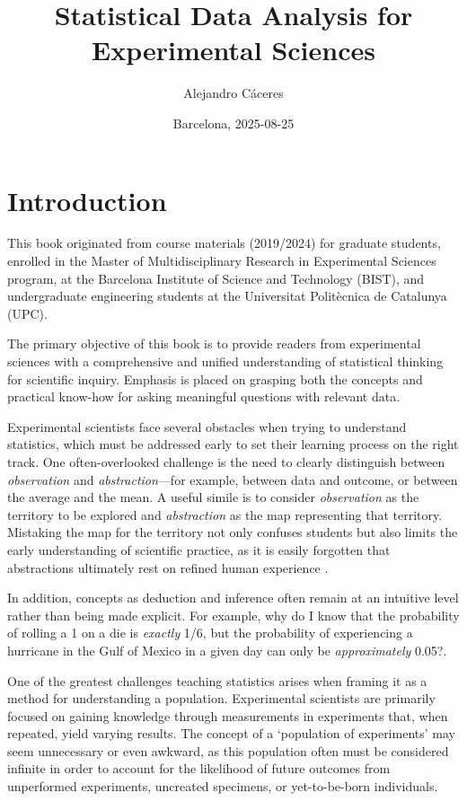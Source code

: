 \documentclass[
]{book}
\title{Statistical Data Analysis
for
Experimental Sciences}
\author{Alejandro Cáceres}
\date{Barcelona, 2025-08-25}
\begin{document}
\maketitle

{
\setcounter{tocdepth}{1}
\tableofcontents
}
\hypertarget{introduction}{%
\chapter{Introduction}\label{introduction}}

This book originated from course materials (2019/2024) for graduate students, enrolled in the Master of Multidisciplinary Research in Experimental Sciences program, at the Barcelona Institute of Science and Technology (BIST), and undergraduate engineering students at the Universitat Politècnica de Catalunya (UPC).

The primary objective of this book is to provide readers from experimental sciences with a comprehensive and unified understanding of statistical thinking for scientific inquiry. Emphasis is placed on grasping both the concepts and practical know-how for asking meaningful questions with relevant data.

Experimental scientists face several obstacles when trying to understand statistics, which must be addressed early to set their learning process on the right track. One often-overlooked challenge is the need to clearly distinguish between \emph{observation} and \emph{abstraction}---for example, between data and outcome, or between the average and the mean. A useful simile is to consider \emph{observation} as the territory to be explored and \emph{abstraction} as the map representing that territory. Mistaking the map for the territory not only confuses students but also limits the early understanding of scientific practice, as it is easily forgotten that abstractions ultimately rest on refined human experience \citep{Frank2024}.

In addition, concepts as deduction and inference often remain at an intuitive level rather than being made explicit. For example, why do I know that the probability of rolling a 1 on a die is \emph{exactly} 1/6, but the probability of experiencing a hurricane in the Gulf of Mexico in a given day can only be \emph{approximately} 0.05?.

One of the greatest challenges teaching statistics arises when framing it as a method for understanding a population. Experimental scientists are primarily focused on gaining knowledge through measurements in experiments that, when repeated, yield varying results. The concept of a `population of experiments' may seem unnecessary or even awkward, as this population often must be considered infinite in order to account for the likelihood of future outcomes from unperformed experiments, uncreated specimens, or yet-to-be-born individuals.
\end{document}
